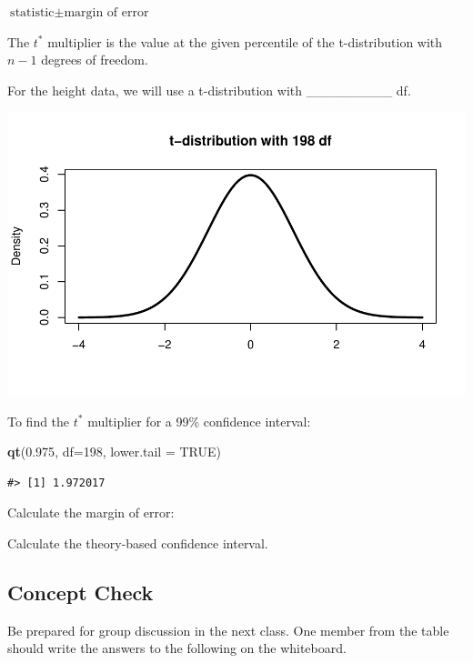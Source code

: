 \documentclass[
]{report}
\newenvironment{Shaded}{\begin{snugshade}}{\end{snugshade}}
\newcommand{\AttributeTok}[1]{\textcolor[rgb]{0.13,0.29,0.53}{#1}}
\newcommand{\ConstantTok}[1]{\textcolor[rgb]{0.56,0.35,0.01}{#1}}
\newcommand{\DecValTok}[1]{\textcolor[rgb]{0.00,0.00,0.81}{#1}}
\newcommand{\FloatTok}[1]{\textcolor[rgb]{0.00,0.00,0.81}{#1}}
\newcommand{\FunctionTok}[1]{\textcolor[rgb]{0.13,0.29,0.53}{\textbf{#1}}}
\newcommand{\NormalTok}[1]{#1}
\newcommand{\rgi}{\hspace{24pt}}  %
\begin{document}
\rgi \(\text{statistic} \pm \text{margin of error}\)

\vspace{0.5in}

The \(t^*\) multiplier is the value at the given percentile of the t-distribution with \(n - 1\) degrees of freedom.

For the height data, we will use a t-distribution with \_\_\_\_\_\_\_\_\_ df.

\begin{center}\includegraphics[width=0.7\linewidth]{11-VN11-paired_files/figure-latex/tstar-1} \end{center}

To find the \(t^*\) multiplier for a 99\% confidence interval:

\begin{Shaded}
\begin{Highlighting}[]
\FunctionTok{qt}\NormalTok{(}\FloatTok{0.975}\NormalTok{, }\AttributeTok{df=}\DecValTok{198}\NormalTok{, }\AttributeTok{lower.tail =} \ConstantTok{TRUE}\NormalTok{)}
\end{Highlighting}
\end{Shaded}

\begin{verbatim}
#> [1] 1.972017
\end{verbatim}

Calculate the margin of error:
\vspace{0.4in}

Calculate the theory-based confidence interval.
\vspace{0.5in}

\subsection{Concept Check}\label{concept-check-9}

Be prepared for group discussion in the next class. One member from the table should write the answers to the following on the whiteboard.
\end{document}
